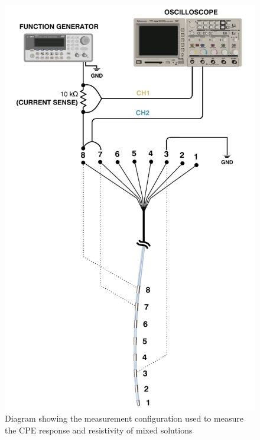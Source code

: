   \begin{figure}
      \centering
      \includegraphics[scale=0.95]{content/pt2/graphics/CreatingCSF_setup}
      \caption{\label{fig:creatingCSF_setup}Diagram showing the measurement configuration used to measure the CPE response and resistivity of mixed solutions}
  \end{figure}

